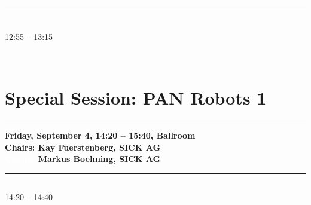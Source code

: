             
            \\ 
            \noindent\rule{\textwidth}{0.4pt}

\vspace*{-36pt}\subsection[ 
    	   {\bf Shape improvement of traffic pedestrian hypotheses by means of stereo-vision and superpixels
           } \\
           {\it Ion Giosan, Sergiu Nedevschi, Ciprian Pocol
           }
	]
	    {
            }
	    $ $

	    12:55 -- 13:15 \nopagebreak
	
            
            \\ 



\section{{\bf \large Special Session: %
PAN Robots 1
}} \vspace{-15pt} %
\noindent\rule{\textwidth}{0.4pt} \nopagebreak
{\bf  
Friday, September 4, 14:20 -- 15:40, Ballroom
} \\ \nopagebreak
{\bf  Chairs: 
Kay Fuerstenberg, SICK AG
} \\ \nopagebreak 
{\bf  \textcolor{white}{Chairs:} 
Markus Boehning, SICK AG
} \\ \nopagebreak 
\noindent\rule{\textwidth}{0.4pt} \nopagebreak
            
\vspace*{-36pt}\subsection[ 
    	   {\bf Fisheye optics for omnidirectional stereo camera
           } \\
           {\it Aki M\"{a}yr\"{a}, Mika Aikio, Kai Ojala, Szilard Mandici, Andrei Vatavu, Sergiu Nedevschi
           }
	]
	    {
            }
	    14:20 -- 14:40 \nopagebreak

